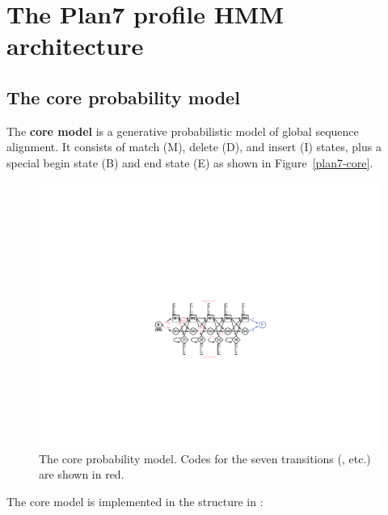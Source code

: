 
\chapter{The Plan7 profile HMM architecture}

%
\section{The core probability model}
%

The \textbf{core model} is a generative probabilistic model of global
sequence alignment. It consists of match (M), delete (D), and insert
(I) states, plus a special begin state (B) and end state (E) as shown
in Figure~\ref{plan7-core}.

\begin{figure}
\begin{center}
\includegraphics{figures/plan7-core}
\end{center}
\caption{The core probability model. Codes for the seven
transitions (, etc.) are shown in red.} 
\label{fig:plan7-core}
\end{figure}

The core model is implemented in the  structure in
:



